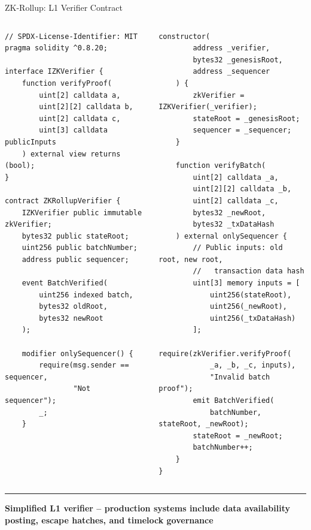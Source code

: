 \documentclass[8pt,aspectratio=169]{beamer}
\newcommand{\bottomnote}[1]{\vfill\vspace{-2mm}\textcolor{mllavender2}{\rule{\textwidth}{0.4pt}}\vspace{1mm}\footnotesize\textbf{#1}}
\begin{document}
\begin{frame}[fragile]{ZK-Rollup: L1 Verifier Contract}
\begin{columns}[T]
\begin{lstlisting}[basicstyle=\fontsize{4.5pt}{5.5pt}\ttfamily]
// SPDX-License-Identifier: MIT
pragma solidity ^0.8.20;

interface IZKVerifier {
    function verifyProof(
        uint[2] calldata a,
        uint[2][2] calldata b,
        uint[2] calldata c,
        uint[3] calldata publicInputs
    ) external view returns (bool);
}

contract ZKRollupVerifier {
    IZKVerifier public immutable zkVerifier;
    bytes32 public stateRoot;
    uint256 public batchNumber;
    address public sequencer;

    event BatchVerified(
        uint256 indexed batch,
        bytes32 oldRoot,
        bytes32 newRoot
    );

    modifier onlySequencer() {
        require(msg.sender == sequencer,
                "Not sequencer");
        _;
    }
\end{lstlisting}
\begin{lstlisting}[basicstyle=\fontsize{4.5pt}{5.5pt}\ttfamily]
    constructor(
        address _verifier,
        bytes32 _genesisRoot,
        address _sequencer
    ) {
        zkVerifier = IZKVerifier(_verifier);
        stateRoot = _genesisRoot;
        sequencer = _sequencer;
    }

    function verifyBatch(
        uint[2] calldata _a,
        uint[2][2] calldata _b,
        uint[2] calldata _c,
        bytes32 _newRoot,
        bytes32 _txDataHash
    ) external onlySequencer {
        // Public inputs: old root, new root,
        //   transaction data hash
        uint[3] memory inputs = [
            uint256(stateRoot),
            uint256(_newRoot),
            uint256(_txDataHash)
        ];
        require(zkVerifier.verifyProof(
            _a, _b, _c, inputs),
            "Invalid batch proof");
        emit BatchVerified(
            batchNumber, stateRoot, _newRoot);
        stateRoot = _newRoot;
        batchNumber++;
    }
}
\end{lstlisting}
\end{columns}
\bottomnote{Simplified L1 verifier -- production systems include data availability posting, escape hatches, and timelock governance}
\end{frame}
\end{document}
